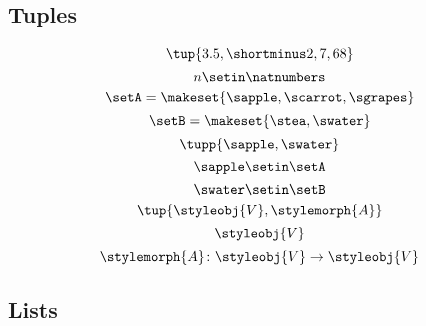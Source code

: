 {\begin{forslides}
    \subsection{Tuples}

    \begin{equation}
        \label{eq:slides_session2_31}
        \tup{3.5, \shortminus 2, 7, 68}
    \end{equation}
    \begin{equation}
        \label{eq:slides_session2_32}
        n \setin \natnumbers
    \end{equation}
    \begin{equation}
        \label{eq:slides_session2_33}
        \setA = \makeset{ \sapple, \scarrot, \sgrapes}
    \end{equation}
    \begin{equation}
        \label{eq:slides_session2_34}
        \setB = \makeset{ \stea, \swater }
    \end{equation}
    \begin{equation}
        \label{eq:slides_session2_35}
        \tupp{\sapple, \swater}
    \end{equation}
    \begin{equation}
        \label{eq:slides_session2_36}
        \sapple \setin\setA
    \end{equation}
    \begin{equation}
        \label{eq:slides_session2_37}
        \swater \setin\setB
    \end{equation}
    \begin{equation}
        \label{eq:slides_session2_38}
        \tup{\styleobj{V}, \stylemorph{A}}
    \end{equation}
    \begin{equation}
        \label{eq:slides_session2_39}
        \styleobj{V}
    \end{equation}
    \begin{equation}
        \label{eq:slides_session2_40}
        \stylemorph{A}\colon \styleobj{V} \to \styleobj{V}
    \end{equation}

    \subsection{Lists}


\end{forslides}}
